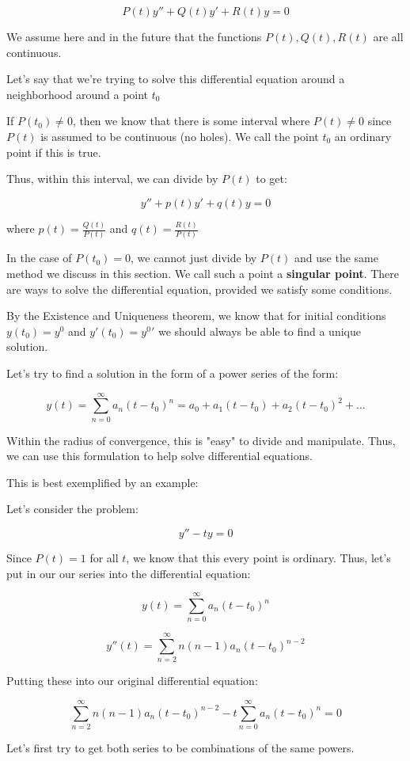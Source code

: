 \documentclass{report}
\begin{document}
$$P(t)y'' + Q(t)y' + R(t)y = 0$$

We assume here and in the future that the functions $P(t), Q(t), R(t)$ are all continuous.

Let's say that we're trying to solve this differential equation around a neighborhood around a point $t_0$

If $P(t_0) \neq 0$, then we know that there is some interval where $P(t) \neq 0$ since $P(t)$ is assumed to be continuous (no holes). We call the point $t_0$ an ordinary point if this is true.


Thus, within this interval, we can divide by $P(t)$ to get:

$$y'' + p(t)y' + q(t)y = 0$$

where $p(t) = \frac{Q(t)}{P(t)}$ and $q(t) =\frac{R(t)}{P(t)} $


In the case of $P(t_0) = 0$, we cannot just divide by $P(t)$ and use the same method we discuss in this section. We call such a point a \textbf{singular point}. There are ways to solve the differential equation, provided we satisfy some conditions. 


By the Existence and Uniqueness theorem, we know that for initial conditions
$y(t_0) = y^0$ and $y'(t_0) = y^0'$ we should always be able to find a unique solution.

Let's try to find a solution in the form of a power series of the form:

$$y(t) 
= \sum_{n=0}^{\infty}a_n(t-t_0)^n 
= a_0 + a_1(t-t_0) + a_2(t-t_0)^2 + \dots$$

Within the radius of convergence, this is "easy" to divide and manipulate. Thus, we can use this formulation to help solve differential equations.

This is best exemplified by an example:


Let's consider the problem:

$$y'' - ty = 0$$

Since $P(t) = 1$ for all $t$, we know that this every point is ordinary. Thus, let's put in our our series into the differential equation:

$$y(t) 
= \sum_{n=0}^{\infty}a_n(t-t_0)^n $$

$$y''(t) 
= \sum_{n=2}^{\infty}n(n-1)a_n(t-t_0)^{n-2} $$

Putting these into our original differential equation:

$$
\sum_{n=2}^{\infty}n(n-1)a_n(t-t_0)^{n-2}
-t\sum_{n=0}^{\infty}a_n(t-t_0)^n = 0
$$

Let's first try to get both series to be combinations of the same powers.
\end{document}
